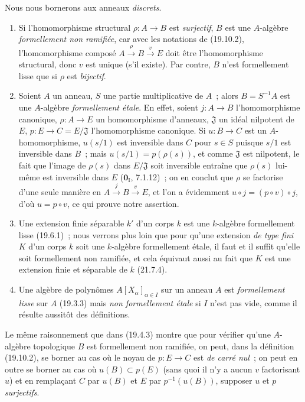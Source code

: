 
\begin{examples}[19.10.3]
\label{0.19.10.3-fr}
Nous nous bornerons aux anneaux \emph{discrets}.
\begin{enumerate}
  \item[(i)] Si l'homomorphisme structural $\rho:A\to B$ est \emph{surjectif},
  $B$ est une $A$-algèbre \emph{formellement non ramifiée}, car avec les
  notations de (19.10.2), l'homomorphisme composé
  $A\xrightarrow{\rho}B\xrightarrow{v}E$ doit être l'homomorphisme structural,
  donc $v$ est unique (s'il existe). Par contre, $B$ n'est formellement lisse
  que si $\rho$ est \emph{bijectif}.
  \item[(ii)] Soient $A$ un anneau, $S$ une partie multiplicative de $A$~;
  alors $B=S^{-1}A$ est une $A$-algèbre \emph{formellement étale}. En effet,
  soient $j:A\to B$ l'homomorphisme canonique, $\rho:A\to E$ un homomorphisme
  d'anneaux, $\mathfrak J$ un idéal nilpotent de $E$,
  $p:E\to C=E/\mathfrak J$ l'homomorphisme canonique. Si $u:B\to C$ est un
  $A$-homomorphisme, $u(s/1)$ est inversible dans $C$ pour $s\in S$ puisque
  $s/1$ est inversible dans $B$~; mais $u(s/1)=p(\rho(s))$, et comme
  $\mathfrak J$ est nilpotent, le fait que l'image de $\rho(s)$ dans
  $E/\mathfrak J$ soit inversible entraîne que $\rho(s)$ lui-même est
  inversible dans $E$ ($\mathbf 0_{\mathrm I}$, 7.1.12)~; on en conclut que
  $\rho$ se factorise d'une seule manière en
  $A\xrightarrow{j}B\xrightarrow{v}E$, et l'on a évidemment
  $u\circ j=(p\circ v)\circ j$, d'où $u=p\circ v$, ce qui prouve notre
  assertion.
  \item[(iii)] Une extension finie séparable $k'$ d'un corps $k$ est une
  $k$-algèbre formellement lisse (19.6.1)~; nous verrons plus loin que pour
  qu'une extension \emph{de type fini} $K$ d'un corps $k$ soit une $k$-algèbre
  formellement étale, il faut et il suffit qu'elle soit formellement non
  ramifiée, et cela équivaut aussi au fait que $K$ est une extension finie et
  séparable de $k$ (21.7.4).
  \item[(iv)] Une algèbre de polynômes $A[X_\alpha]_{\alpha\in I}$ sur un
  anneau $A$ est \emph{formellement lisse} sur $A$ (19.3.3) mais \emph{non
  formellement étale} si $I$ n'est pas vide, comme il résulte aussitôt des
  définitions.
\end{enumerate}
\end{examples}

\begin{remark}[19.10.4]
\label{0.19.10.4-fr}
Le même raisonnement que dans (19.4.3) montre que pour vérifier qu'une
$A$-algèbre topologique $B$ est formellement non ramifiée, on peut, dans la
définition (19.10.2), se borner au cas où le noyau de $p:E\to C$ est
\emph{de carré nul}~; on peut en outre se borner au cas où $u(B)\subset p(E)$
(sans quoi il n'y a aucun $v$ factorisant $u$) et en remplaçant $C$ par $u(B)$
et $E$ par $p^{-1}(u(B))$, supposer $u$ et $p$ \emph{surjectifs}.
\end{remark}
